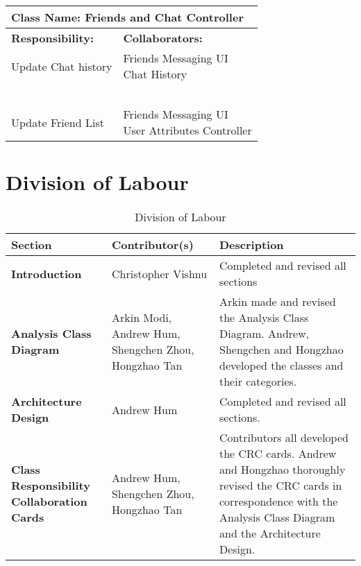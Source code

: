 \documentclass[]{article}
\begin{document}
\begin{table}[H]
    \centering
    \begin{tabular}{|p{7.5cm}|p{7.5cm}|}
        \hline
        \multicolumn{2}{|l|}{\textbf{Class Name:} Friends and Chat Controller}\\
        \hline
        \textbf{Responsibility:} & \textbf{Collaborators:}\\
        \hline
        Update Chat history & \makecell[l]{Friends Messaging UI\\Chat History}\\
        ~ & ~\\
        Update Friend List & \makecell[l]{Friends Messaging UI\\User Attributes Controller}\\
        \hline
    \end{tabular}
\end{table}

\newpage
\appendix
\section{Division of Labour}
\label{sec:division_of_labour}
\begin{table}[H]
    \centering
    \caption{Division of Labour}
    \begin{tabular}{|p{2.5cm}|p{2.5cm}|p{10.5cm}|}
        \hline
        \textbf{Section} & \textbf{Contributor(s)} & \textbf{Description}\\
        \hline
        \textbf{Introduction} & Christopher Vishnu & Completed and revised all sections\\
        \hline
        \textbf{Analysis Class Diagram} & Arkin Modi, Andrew Hum, Shengchen Zhou, Hongzhao Tan & Arkin made and revised the Analysis Class Diagram. Andrew, Shengchen and Hongzhao developed the classes and their categories.\\
        \hline
        \textbf{Architecture Design} & Andrew Hum & Completed and revised all sections.\\
        \hline
        \textbf{Class Responsibility Collaboration Cards} & Andrew Hum, Shengchen Zhou, Hongzhao Tan & Contributors all developed the CRC cards. Andrew and Hongzhao thoroughly revised the CRC cards in correspondence with the Analysis Class Diagram and the Architecture Design.\\
        \hline
    \end{tabular}
\end{table}
\end{document}
